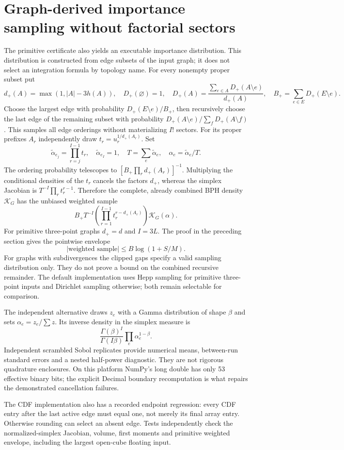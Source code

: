 \section{Graph-derived importance sampling without factorial sectors}

The primitive certificate also yields an executable importance distribution.
This distribution is constructed from edge subsets of the input graph; it
does not select an integration formula by topology name. For every nonempty
proper subset put
\[
 d_+(A)=\max(1,|A|-3h(A)),\quad
 D_+(\varnothing)=1,\quad
 D_+(A)=\frac{\sum_{e\in A}D_+(A\setminus e)}{d_+(A)},\quad
 B_+=\sum_{e\in E}D_+(E\setminus e).
\]
Choose the largest edge with probability $D_+(E\setminus e)/B_+$, then
recursively choose the last edge of the remaining subset with probability
$D_+(A\setminus e)/\sum_fD_+(A\setminus f)$. This samples all edge orderings
without materializing $I!$ sectors. For its proper prefixes $A_r$ independently
draw $t_r=u_r^{1/d_+(A_r)}$. Set
\[
 \widetilde\alpha_{e_j}=\prod_{r=j}^{I-1}t_r,\quad
 \widetilde\alpha_{e_I}=1,\quad
 T=\sum_e\widetilde\alpha_e,\quad\alpha_e=\widetilde\alpha_e/T.
\]
The ordering probability telescopes to
$[B_+\prod_r d_+(A_r)]^{-1}$. Multiplying the conditional densities of the
$t_r$ cancels the factors $d_+$, whereas the simplex Jacobian is
$T^{-I}\prod_rt_r^{r-1}$. Therefore the complete, already combined BPH
density $\mathcal K_G$ has the unbiased weighted sample
\[
 B_+ T^{-I}\!\left(\prod_{r=1}^{I-1}t_r^{r-d_+(A_r)}\right)
 \mathcal K_G(\alpha).
\]
For primitive three-point graphs $d_+=d$ and $I=3L$. The proof in the
preceding section gives the pointwise envelope
\[
 |\text{weighted sample}|\le B\log(1+S/M).
\]
For graphs with subdivergences the clipped gaps specify a valid sampling
distribution only. They do not prove a bound on the combined recursive
remainder. The default implementation uses Hepp sampling for primitive
three-point inputs and Dirichlet sampling otherwise; both remain selectable
for comparison.

The independent alternative draws $z_e$ with a Gamma distribution of shape
$\beta$ and sets $\alpha_e=z_e/\sum z$. Its inverse density in the simplex
measure is
\[
 \frac{\Gamma(\beta)^I}{\Gamma(I\beta)}
 \prod_e\alpha_e^{1-\beta}.
\]
Independent scrambled Sobol replicates provide numerical means, between-run
standard errors and a nested half-power diagnostic. They are not rigorous
quadrature enclosures. On this platform NumPy's long double has only 53
effective binary bits; the explicit Decimal boundary recomputation is what
repairs the demonstrated cancellation failures.

The CDF implementation also has a recorded endpoint regression: every CDF
entry after the last active edge must equal one, not merely its final array
entry. Otherwise rounding can select an absent edge. Tests independently
check the normalized-simplex Jacobian, volume, first moments and primitive
weighted envelope, including the largest open-cube floating input.
